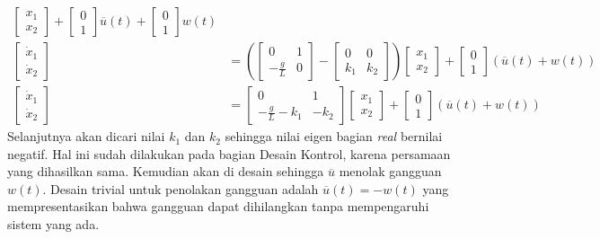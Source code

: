 \documentclass{article}
\begin{document}
\begin{align*}
    \begin{bmatrix} x_1 \\ x_2 \end{bmatrix} +
    \begin{bmatrix} 0 \\ 1 \end{bmatrix} \overline{u}(t) +
    \begin{bmatrix} 0 \\ 1 \end{bmatrix}w(t)                        \\ %
    \begin{bmatrix} \dot{x}_1 \\ \dot{x}_2 \end{bmatrix} & = \left(
    \begin{bmatrix} 0 & 1 \\ -\frac{g}{L} & 0 \end{bmatrix} - \begin{bmatrix} 0 & 0 \\ k_1 & k_2\end{bmatrix} \right)
    \begin{bmatrix} x_1 \\ x_2 \end{bmatrix} +
    \begin{bmatrix} 0 \\ 1 \end{bmatrix} (\overline{u}(t)+w(t))     \\ %
    \begin{bmatrix} \dot{x}_1 \\ \dot{x}_2 \end{bmatrix} & =
    \begin{bmatrix} 0 & 1 \\ -\frac{g}{L}-k_1 & -k_2 \end{bmatrix}
    \begin{bmatrix} x_1 \\ x_2 \end{bmatrix} +
    \begin{bmatrix} 0 \\ 1 \end{bmatrix} (\overline{u}(t)+w(t)) %
\end{align*}
Selanjutnya akan dicari nilai $k_1$ dan $k_2$ sehingga nilai eigen bagian \textit{real} bernilai negatif. Hal ini sudah dilakukan pada bagian Desain Kontrol, karena persamaan yang dihasilkan sama. Kemudian akan di desain sehingga $\overline{u}$ menolak gangguan $w(t)$. Desain trivial untuk penolakan gangguan adalah $\overline{u}(t)=-w(t)$ yang mempresentasikan bahwa gangguan dapat dihilangkan tanpa mempengaruhi sistem yang ada.
\end{document}
